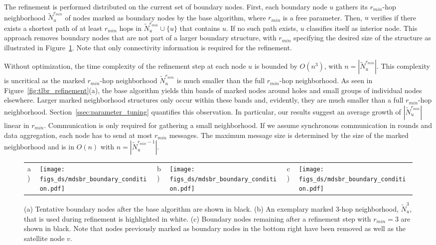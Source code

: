\documentclass{llncs}
\begin{document}
The refinement is performed distributed on the current set of boundary nodes.
First, each boundary node $u$ gathers its $r_{min}$-hop neighborhood $\tilde N_u^{r_{min}}$ of nodes marked as boundary nodes by the base algorithm, where $r_{min}$ is a free parameter.
Then, $u$ verifies if there exists a shortest path of at least $r_{min}$ hops in $\tilde N_u^{r_{min}} \cup \{u\}$ that contains $u$.
If no such path exists, $u$ classifies itself as interior node.
This approach removes boundary nodes that are not part of a larger boundary structure, with $r_{min}$ specifying the desired size of the structure as illustrated in Figure~\ref{fig:tlbr_refinement2}.
Note that only connectivity information is required for the refinement.

Without optimization, the time complexity of the refinement step at each node $u$ is bounded by $O(n^3)$, with $n=|\tilde N_u^{r_{min}}|$.
This complexity is uncritical as the marked $r_{min}$-hop neighborhood $\tilde N_u^{r_{min}}$ is much smaller than the full $r_{min}$-hop neighborhood.
As seen in Figure~\ref{fig:tlbr_refinement}(a), the base algorithm yields thin bands of marked nodes around holes and small groups of individual nodes elsewhere.
Larger marked neighborhood structures only occur within these bands and, evidently, they are much smaller than a full $r_{min}$-hop neighborhood.
Section~\ref{ssec:parameter_tuning} quantifies this observation.
In particular, our results suggest an average growth of $|\tilde N_u^{r_{min}}|$ linear in $r_{min}$.
Communication is only required for gathering a small neighborhood.
If we assume synchronous communication in rounds and data aggregation, each node has to send at most $r_{min}$ messages.
The maximum message size is determined by the size of the marked neighborhood and is in $O(n)$ with $n = |\tilde N_u^{r_{min}-1}|$.

\begin{figure}[t]
\centering
\begin{tabular}{llllll}
a) \hspace{0.2cm} &
\parbox[c]{.25\columnwidth}{\texttt{[image: figs\_ds/mdsbr\_boundary\_condition.pdf]}} &
\hspace{0.5cm}  b) \hspace{0.2cm} &
\parbox[c]{.25\columnwidth}{\texttt{[image: figs\_ds/mdsbr\_boundary\_condition.pdf]}} &
\hspace{0.5cm}  c) \hspace{0.2cm} &
\parbox[c]{.25\columnwidth}{\texttt{[image: figs\_ds/mdsbr\_boundary\_condition.pdf]}}
\end{tabular}
\caption{(a) Tentative boundary nodes after the base algorithm are shown in black. (b) An exemplary marked $3$-hop neighborhood, $\tilde N_u^3$, that is used during refinement is highlighted in white. (c) Boundary nodes remaining after a refinement step with $r_{min} = 3$ are shown in black. Note that nodes previously marked as boundary nodes in the bottom right have been removed as well as the satellite node $v$.}\label{fig:tlbr_refinement2}
\end{figure}
\end{document}

